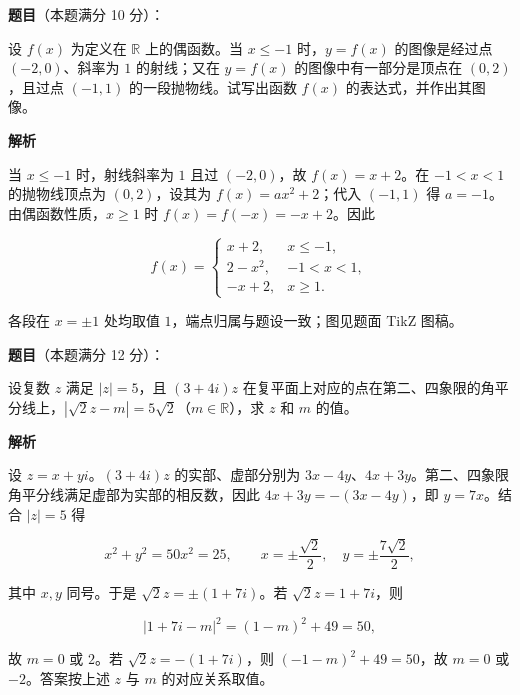 \begin{answer}

\textbf{题目}（本题满分 10 分）：

设 $f(x)$ 为定义在 $\mathbb{R}$ 上的偶函数。当 $x\le -1$ 时，$y=f(x)$ 的图像是经过点 $(-2,0)$、斜率为 $1$ 的射线；又在 $y=f(x)$ 的图像中有一部分是顶点在 $(0,2)$，且过点 $(-1,1)$ 的一段抛物线。试写出函数 $f(x)$ 的表达式，并作出其图像。
\nopagebreak[4]
\begin{center}\end{center}
\nopagebreak[4]
\textbf{解析}

当 $x\le-1$ 时，射线斜率为 $1$ 且过 $(-2,0)$，故 $f(x)=x+2$。在 $-1<x<1$ 的抛物线顶点为 $(0,2)$，设其为 $f(x)=ax^2+2$；代入 $(-1,1)$ 得 $a=-1$。由偶函数性质，$x\ge1$ 时 $f(x)=f(-x)=-x+2$。因此

\nopagebreak[4]
\[
f(x)=\begin{cases}
x+2,&x\le-1,\\
2-x^2,&-1<x<1,\\
-x+2,&x\ge1.
\end{cases}
\]

各段在 $x=\pm1$ 处均取值 $1$，端点归属与题设一致；图见题面 TikZ 图稿。


\end{answer}
\begin{answer}

\textbf{题目}（本题满分 12 分）：

设复数 $z$ 满足 $|z|=5$，且 $(3+4i)z$ 在复平面上对应的点在第二、四象限的角平分线上，$|\sqrt{2}z-m|=5\sqrt{2}$（$m\in\mathbb{R}$），求 $z$ 和 $m$ 的值。

\textbf{解析}

设 $z=x+yi$。$(3+4i)z$ 的实部、虚部分别为 $3x-4y$、$4x+3y$。第二、四象限角平分线满足虚部为实部的相反数，因此 $4x+3y=-(3x-4y)$，即 $y=7x$。结合 $|z|=5$ 得

\nopagebreak[4]
\[
x^2+y^2=50x^2=25,\qquad x=\pm\frac{\sqrt2}{2},\quad y=\pm\frac{7\sqrt2}{2},
\]

其中 $x,y$ 同号。于是 $\sqrt2z=\pm(1+7i)$。若 $\sqrt2z=1+7i$，则

\nopagebreak[4]
\[
|1+7i-m|^2=(1-m)^2+49=50,
\]

故 $m=0$ 或 $2$。若 $\sqrt2z=-(1+7i)$，则 $(-1-m)^2+49=50$，故 $m=0$ 或 $-2$。答案按上述 $z$ 与 $m$ 的对应关系取值。


\end{answer}
